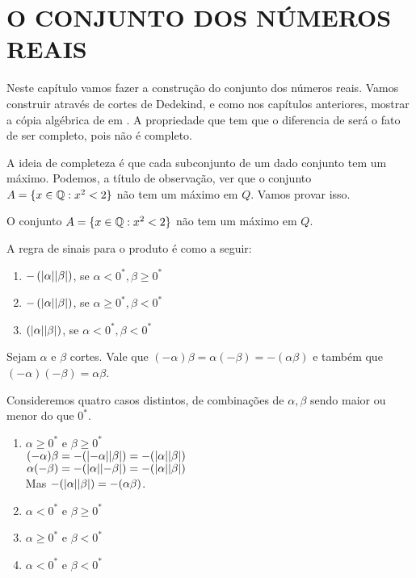 \documentclass[../main.tex]{subfiles}
\begin{document}
\chapter{O CONJUNTO DOS NÚMEROS REAIS}\label{cap-reais}

Neste capítulo vamos fazer a construção do conjunto dos números reais. Vamos construir através de cortes de Dedekind, e como nos capítulos anteriores, mostrar a cópia algébrica de \Q em \R. A propriedade que \R tem que o diferencia de \Q será o fato de ser completo, pois \Q não é completo.

A ideia de completeza é que cada subconjunto de um dado conjunto tem um máximo. Podemos, a título de observação, ver que o conjunto 
$A = \{ x \in \mathbb{Q} : x^2 < 2\}$ não tem um máximo em $Q$. Vamos provar isso.
\begin{prop}
    O conjunto $A = \{ x \in \mathbb{Q} : x^2 < 2\}$ não tem um máximo em $Q$.
\end{prop}
\begin{dem}
\end{dem}


\begin{defi}
    A regra de sinais para o produto é como a seguir:
    \begin{enumerate}[label=(\roman*)]
        \item $-\left(\abs{\alpha}\abs{\beta}\right)$, se $\alpha < 0^*, \beta \geq 0^*$
        \item $-\left(\abs{\alpha}\abs{\beta}\right)$, se $\alpha \geq 0^*, \beta < 0^*$
        \item $\left(\abs{\alpha}\abs{\beta}\right)$, se $\alpha < 0^*, \beta < 0^*$
    \end{enumerate}
\end{defi}
\begin{prop}
    Sejam $\alpha$ e $\beta$ cortes. Vale que $\left( - \alpha \right) \beta = \alpha \left( -\beta \right) = -\left(\alpha \beta \right) $ e também que $\left( -\alpha \right) \left( -\beta \right) = \alpha \beta$.
\end{prop}
\begin{dem}
Consideremos quatro casos distintos, de combinações de $\alpha, \beta$ sendo maior ou menor do que $0^*$.
\begin{enumerate}
    \item $\alpha \geq 0^*$ e $\beta \geq 0^*$ \\
        $(-\alpha)\beta = -(\abs{-\alpha}\abs{\beta}) = -(\abs{\alpha}\abs{\beta})$ \\
        $\alpha(-\beta) = -(\abs{\alpha}\abs{-\beta}) = -(\abs{\alpha}\abs{\beta})$ \\
        Mas $-(\abs{\alpha}\abs{\beta}) = -(\alpha\beta)$.
        
    \item $\alpha < 0^*$ e $\beta \geq 0^*$
    
    \item $\alpha \geq 0^*$ e $\beta < 0^*$
    
    \item $\alpha < 0^*$ e $\beta < 0^*$
\end{enumerate}
\end{dem}
\end{document}
